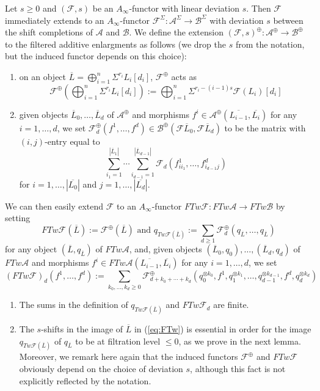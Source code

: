 Let $s\geq 0$ and $(\mathcal{F},s)$ be an $A_\infty$-functor with linear deviation $s$. Then $\mathcal{F}$ immediately extends to an $A_\infty$-functor $\mathcal{F}^\Sigma\colon \mathcal{A}^\Sigma\to \mathcal{B}^\Sigma$ with deviation $s$ between the shift completions of $\mathcal{A}$ and $\mathcal{B}$. We define the extension $(\mathcal{F},s)^\oplus\colon \mathcal{A}^\oplus\to \mathcal{B}^\oplus$ to the filtered additive enlargments as follows (we drop the $s$ from the notation, but the induced functor depends on this choice):
\begin{enumerate}
	\item on an object $\overline{L}=\bigoplus_{i=1}^n\Sigma^{r_i}L_i[d_i]$, $\mathcal{F}^\oplus$ acts as \begin{equation}\label{eq:FTw}
		\mathcal{F}^\oplus\left(\bigoplus_{i=1}^n\Sigma^{r_i}L_i[d_i]\right):= \bigoplus_{i=1}^n\Sigma^{r_i-(i-1)s}\mathcal{F}(L_i)[d_i]
	\end{equation}
	\item given objects $\overline{L}_0,\ldots, \overline{L}_d$ of $\mathcal{A}^\oplus$ and morphisms $f^i\in \mathcal{A}^\oplus(\overline{L_{i-1}},\overline{L_i})$ for any $i=1,\ldots, d$, we set $\mathcal{F}^\oplus_d(f^1,\ldots,f^d)\in \mathcal{B}^\oplus(\mathcal{F}\overline{L}_0,\mathcal{F}\overline{L}_d)$ to be the matrix with $(i,j)$-entry equal to $$\sum_{i_1=1}^{|\overline{L}_1|}\cdots \sum_{i_{d-1}=1}^{|\overline{L}_{d-1}|}\mathcal{F}_d\left(f^1_{ii_1},\ldots, f^d_{i_{d-1}j}\right)$$ for $i=1,\ldots, |\overline{L_0}|$ and $j=1,\ldots, |\overline{L_d}|$.
\end{enumerate}
We can then easily extend $\mathcal{F}$ to an $A_\infty$-functor $FTw\mathcal{F}\colon FTw\mathcal{A}\to FTw\mathcal{B}$ by setting $$FTw\mathcal{F}(\overline{L}):= \mathcal{F}^\oplus(\overline{L})\text{  and  } q_{Tw\mathcal{F}(\overline{L})} := \sum_{d\geq 1}\mathcal{F}^\oplus_d(q_{\overline{L}},\ldots, q_{\overline{L}})$$ for any object $(\overline{L},q_{\overline{L}})$ of $FTw\mathcal{A}$, and, given objects $(\overline{L}_0,q_0),\ldots, (\overline{L}_d,q_d)$ of $FTw\mathcal{A}$ and morphisms $f^i\in FTw\mathcal{A}(\overline{L_{i-1}},\overline{L_i})$ for any $i=1,\ldots, d$, we set
$$(FTw\mathcal{F})_d(f^1,\ldots, f^d) := \sum_{k_0,\ldots, k_d\geq 0}\mathcal{F}^\oplus_{d+k_0+\cdots + k_d}\left(q_0^{\otimes k_0}, f^1,q_1^{\otimes k_1},\ldots, q_{d-1}^{\otimes k_{d-1}},f^d, q_d^{\otimes k_d}\right)$$
\begin{rem}
	\begin{enumerate}
		\item The sums in the definition of $q_{Tw\mathcal{F}(\overline{L})}$ and $FTw\mathcal{F}_d$ are finite. 
		\item The $s$-shifts in the image of $\overline{L}$ in (\ref{eq:FTw}) is essential in order for the image $q_{Tw\mathcal{F}(\overline{L})}$ of $q_{\overline{L}}$ to be at filtration level $\leq 0$, as we prove in the next lemma. Moreover, we remark here again that the induced functors $\mathcal{F}^\oplus$ and $FTw\mathcal{F}$ obviously depend on the choice of deviation $s$, although this fact is not explicitly reflected by the notation.
	\end{enumerate}
\end{rem}

